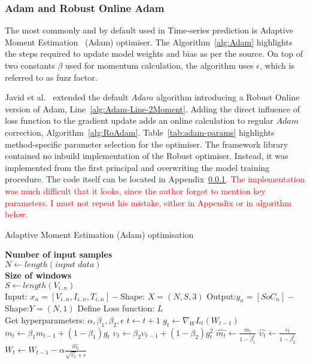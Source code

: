 \subsubsection{Adam and Robust Online Adam}
The most commonly and by default used in Time-series prediction is Adaptive Moment Estimation~\cite{kingma_adam_2017} (Adam) optimiser.
The Algorithm~\ref{alg:Adam} highlights the steps required to update model weights and bias as per the source.
On top of two constants $\beta$ used for momentum calculation, the algorithm uses $\epsilon$, which is referred to as fuzz factor.

%
%
Javid et al.~\cite{javid_adaptive_2020} extended the default $Adam$ algorithm introducing a Robust Online version of Adam, Line~\ref{alg:Adam-Line-2Moment}.
Adding the direct influence of loss function to the gradient update adds an online calculation to regular $Adam$ correction, Algorithm~\ref{alg:RoAdam}.
Table~\ref{tab:adam-params} highlights method-specific parameter selection for the optimiser.
The framework library contained no inbuild implementation of the Robust optimiser.
Instead, it was implemented from the first principal and overwriting the model training procedure.
The code itself can be located in Appendix~\ref{}.
\textcolor{red}{The implementation was much difficult that it looks, since the author forgot to mention key parameters. I must not repeat his mistake, either in Appendix or in algorithm below.}
\begin{algorithm}
  \caption{Adaptive Moment Estimation (Adam) optimisation}
  \begin{algorithmic}[1]
    \STATE \textbf{Number of input samples} \\ $N\gets length(\textit{input data})$\\
    \STATE \textbf{Size of windows} \\ $S\gets length(V_{i..n})$\\
    \STATE Input: $x_n = [V_{i..n}, I_{i..n}, T_{i..n}] - $Shape: $X = (N, S, 3)$
    \STATE Output:$y_n = [SoC_{n}] - $Shape:$Y = (N, 1)$
    \STATE Define Loss function: $L$ \\
           Get hyperparameters: $\alpha, \beta_1, \beta_2, \epsilon$
    \STATE $t \gets t+1$
    \STATE $g_t \gets \nabla_W L_t (W_{t-1})$ 
    \STATE $m_t \gets \beta_1 m_{t-1}+(1-\beta_1) g_t $ 
    \STATE $\upsilon_t \gets \beta_2 \upsilon_{t-1}+ \left(1-\beta_2 \right)g^2_t $ 
    \STATE $\hat{m_t} \gets \frac{m_t}{1-\beta^t_1}$ 
    \STATE $\hat{\upsilon_t} \gets \frac{\upsilon_t}{1-\beta^t_2} $ 
    \STATE $W_t \gets W_{t-1}- \alpha \frac{\hat{m_t}}{\sqrt{\hat{\upsilon_t}}+\epsilon} $ 
    \ENDWHILE
  \end{algorithmic}
  \label{alg:Adam}
\end{algorithm}
